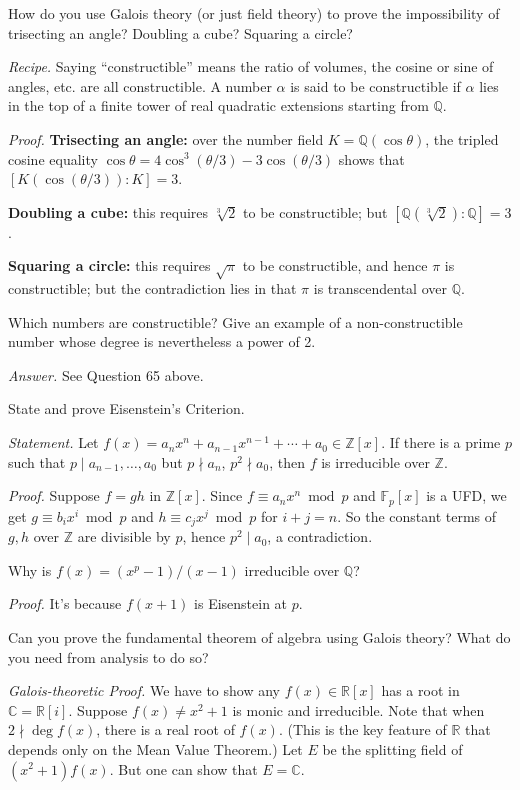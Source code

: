 \documentclass{mathproblems}
\newcommand\Q{\mathbb{Q}}
\newcommand\R{\mathbb{R}}
\newcommand\C{\mathbb{C}}
\newcommand\Z{\mathbb{Z}}
\newcommand\F{\mathbb{F}}
\begin{document}
\begin{questions}
\miquestion
{\color{blue} How do you use Galois theory (or just field theory) to prove the impossibility of trisecting an angle? Doubling a cube? Squaring a circle?}

{\color{violet}
\textit{Recipe.} Saying ``constructible'' means the ratio of volumes, the cosine or sine of angles, etc. are all constructible. A number $\alpha$ is said to be constructible if $\alpha$ lies in the top of a finite tower of real quadratic extensions starting from $\Q$.
}

\textit{Proof.} \textbf{Trisecting an angle:} over the number field $K=\Q(\cos\theta)$, the tripled cosine equality $\cos\theta=4\cos^3(\theta/3)-3\cos(\theta/3)$ shows that $[K(\cos(\theta/3)):K]=3$.

\textbf{Doubling a cube:} this requires $\sqrt[3]{2}$ to be constructible; but $[\Q(\sqrt[3]{2}):\Q]=3$.

\textbf{Squaring a circle:} this requires $\sqrt{\pi}$ to be constructible, and hence $\pi$ is constructible; but the contradiction lies in that $\pi$ is transcendental over $\Q$.

\miquestion
{\color{blue} Which numbers are constructible? Give an example of a non-constructible number whose degree is nevertheless a power of 2.}

\textit{Answer.} See Question 65 above.

\miquestion
{\color{blue} State and prove Eisenstein's Criterion.}

\textit{Statement.}
Let $f(x)=a_n x^n+a_{n-1}x^{n-1}+\cdots+a_0\in \Z[x]$. If there is a prime $p$ such that $p\mid a_{n-1},\ldots,a_0$ but $p \nmid a_n$, $p^2\nmid a_0$, then $f$ is irreducible over $\Z$.

\textit{Proof.}
Suppose $f=g h$ in $\Z[x]$. Since $f\equiv a_n x^n\bmod p$ and $\F_p[x]$ is a UFD, we get $g\equiv b_i x^i\bmod p$ and $h\equiv c_j x^j\bmod p$ for $i+j=n$. So the constant terms of $g,h$ over $\Z$ are divisible by $p$, hence $p^2\mid a_0$, a contradiction.

\miquestion
{\color{blue} Why is $f(x)=(x^{p}-1)/(x-1)$ irreducible over $\Q$?}

\textit{Proof.}
It's because $f(x+1)$ is Eisenstein at $p$.

\miquestion
{\color{blue} Can you prove the fundamental theorem of algebra using Galois theory? What do you need from analysis to do so?}

\textit{Galois-theoretic Proof.} We have to show any $f(x)\in \R[x]$ has a root in $\C=\R[i]$. Suppose $f(x)\neq x^2+1$ is monic and irreducible. Note that when $2\nmid \deg f(x)$, there is a real root of $f(x)$. (This is the key feature of $\R$ that depends only on the Mean Value Theorem.) Let $E$ be the splitting field of $(x^2+1)f(x)$. But one can show that $E=\C$.


\end{questions}
\end{document}
